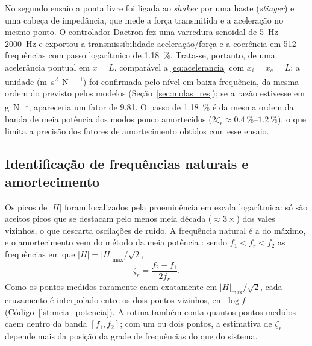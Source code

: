 No segundo ensaio a ponta livre foi ligada ao \emph{shaker} por uma haste
(\emph{stinger}) e uma cabeça de impedância, que mede a força transmitida e a aceleração
no mesmo ponto. O controlador Dactron fez uma varredura senoidal de \SIrange{5}{2000}{\hertz}
e exportou a transmissibilidade aceleração/força e a coerência em 512 frequências com
passo logarítmico de \SI{1.18}{\percent}. Trata-se, portanto, de uma acelerância
pontual em $x = L$, comparável a \eqref{eq:acelerancia} com $x_i = x_e = L$; a unidade
(\si{\meter\per\second\squared\per\newton}) foi confirmada pelo nível em baixa
frequência, da mesma ordem do previsto pelos modelos (Seção~\ref{sec:molas_res}); se
a razão estivesse em \si{g\per\newton}, apareceria um fator de \num{9.81}. O passo de \SI{1.18}{\percent} é da mesma ordem da banda
de meia potência dos modos pouco amortecidos ($2\zeta_r \approx
\SIrange{0.4}{1.2}{\percent}$), o que limita a precisão dos fatores de amortecimento
obtidos com esse ensaio.

\subsection{Identificação de frequências naturais e amortecimento}
\label{sec:met_identificacao}

Os picos de $|H|$ foram localizados pela proeminência em escala logarítmica: só são
aceitos picos que se destacam pelo menos meia década ($\approx 3\times$) dos vales
vizinhos, o que descarta oscilações de ruído. A frequência natural é a do máximo, e o
amortecimento vem do método da meia potência \cite{ewins2000}: sendo $f_1 < f_r < f_2$
as frequências em que $|H| = |H|_{\max}/\sqrt{2}$,
\begin{equation}
    \zeta_r = \frac{f_2 - f_1}{2 f_r}.
    \label{eq:meia_potencia}
\end{equation}
Como os pontos medidos raramente caem exatamente em $|H|_{\max}/\sqrt{2}$, cada
cruzamento é interpolado entre os dois pontos vizinhos, em $\log f$
(Código~\ref{lst:meia_potencia}). A rotina também conta quantos pontos medidos caem
dentro da banda $[f_1, f_2]$; com um ou dois pontos, a estimativa de $\zeta_r$ depende
mais da posição da grade de frequências do que do sistema.


